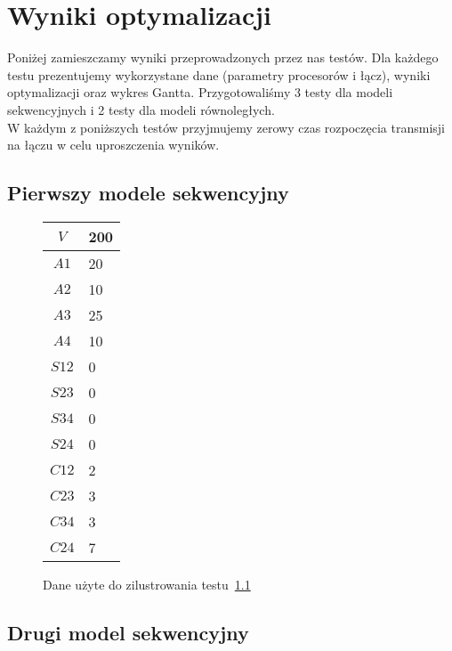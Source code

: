
\section{Wyniki optymalizacji}

Poniżej zamieszczamy wyniki przeprowadzonych przez nas testów.
Dla każdego testu prezentujemy wykorzystane dane (parametry procesorów i łącz),
wyniki optymalizacji oraz wykres Gantta.
Przygotowaliśmy 3 testy dla modeli sekwencyjnych i 2 testy dla modeli równoległych. \\

W każdym z poniższych testów przyjmujemy zerowy czas rozpoczęcia transmisji na łączu w celu uproszczenia wyników.

\subsection{Pierwszy modele sekwencyjny} \label{test1}

\begin{figure}[H]
\centering
\begin{tabular}{|c|l|}
\hline
$V$ & 200 \\ \hline
$A1$ & 20 \\ \hline
$A2$ & 10 \\ \hline
$A3$ & 25 \\ \hline
$A4$ & 10 \\ \hline
$S12$ & 0 \\ \hline
$S23$ & 0 \\ \hline
$S34$ & 0 \\ \hline
$S24$ & 0 \\ \hline
$C12$ & 2 \\ \hline
$C23$ & 3 \\ \hline
$C34$ & 3 \\ \hline
$C24$ & 7 \\ \hline
\end{tabular}
\caption{Dane użyte do zilustrowania testu~\ref{test1}}
\label{tab:res_1}
\end{figure}

\subsection{Drugi model sekwencyjny} \label{test2}

